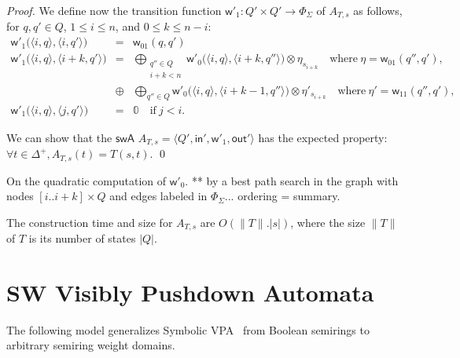 \documentclass[runningheads]{llncs}
\def\<#1>{\langle #1 \rangle}
\newcommand{\zero}{\mathbb{0}}
\def\SWA{\textsf{swA}\xspace}
\def\wei{\mathsf{w}}
\def\init{\mathsf{in}}
\def\final{\mathsf{out}}
\begin{document}
\begin{proof}
\noindent
We define now the transition function 
$\wei'_1: Q' \times Q' \to \Phi_\Sigma$
of $A_{T, s}$ as follows,
for $q, q' \in Q$,
$1 \leq i \leq n$, and $0 \leq k \leq n-i$:
\[
\begin{array}{lcl}
\wei'_1\bigl(\< i, q>, \< i, q'>\bigr) & = & \wei_{01}(q, q')\\
%
\wei'_1\bigl(\< i, q>, \< i+k, q'>\bigr) & = & 
\displaystyle
\bigoplus_{\begin{array}{c}
           \scriptstyle q'' \in Q\\[-2pt]
           \scriptstyle i+k < n
           \end{array}} 
\wei'_0\bigl(\<i, q>, \< i+k, q''>\bigr) \otimes \eta_{s_{i+k}}
\quad \mathrm{where~} \eta = \wei_{01}(q'', q'),\\
 & \oplus & \displaystyle
\bigoplus_{q'' \in Q} \wei'_0\bigl(\<i, q>, \< i+k-1, q''>\bigr) \otimes \eta'_{s_{i+k}}
\quad \mathrm{where~}\eta' = \wei_{11}(q'', q'),\\
%
\wei'_1\bigl(\< i, q>, \< j, q'>\bigr) & = & \zero  
\quad \mathrm{if~} j < i.
\end{array}      
\]
%

\noindent
We can show that the $\SWA$ $A_{T, s} = \< Q', \init', \wei'_1, \final' >$
has the expected property: $\forall t \in \Delta^+, A_{T, s}(t) = T(s, t)$.
\qed
\end{proof}

\noindent
On the quadratic computation of $\wei'_0$. **
by a best path search in the graph with nodes $[i..i+k] \times Q$
and edges labeled in $\Phi_\Sigma$...
ordering = summary.


\noindent
The construction time and size for $A_{T, s}$ are $O(\| T \| . | s |)$,
where the size $\| T \|$ of $T$ is its number of states $|Q|$.

 







\section{SW Visibly Pushdown Automata}
\label{section:SWVPA}\label{sec:SWVPA}
The following model generalizes Symbolic VPA~\cite{dAntonyAlur14SVPDA}
from Boolean semirings to arbitrary semiring weight domains.
\end{document}

